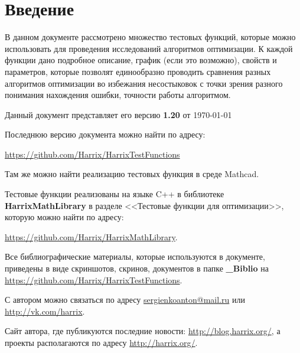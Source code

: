 \chapter*{Введение}

В данном документе рассмотрено множество тестовых функций, которые можно использовать для проведения исследований алгоритмов оптимизации. К каждой функции дано подробное описание, график (если это возможно), свойств и параметров, которые позволят единообразно проводить сравнения разных алгоритмов оптимизации во избежания несостыковок с точки зрения разного понимания нахождения ошибки, точности работы алгоритмом.

Данный документ представляет его версию \textbf{1.20} от \today

Последнюю версию документа можно найти по адресу:

\href{https://github.com/Harrix/HarrixTestFunctions}{https://github.com/Harrix/HarrixTestFunctions}

Там же можно найти реализацию тестовых функция в среде Mathcad.

Тестовые функции реализованы на языке C++ в библиотеке  \textbf{HarrixMathLibrary} в разделе <<Тестовые функции для оптимизации>>, которую можно найти по адресу:

\href{https://github.com/Harrix/HarrixMathLibrary} {https://github.com/Harrix/HarrixMathLibrary}.

Все библиографические материалы, которые используются в документе, приведены в виде скриншотов, скринов, документов в папке \textbf{\_Biblio} на \href{https://github.com/Harrix/HarrixTestFunctions}{https://github.com/Harrix/HarrixTestFunctions}.

С автором можно связаться по адресу \href{mailto:sergienkoanton@mail.ru}{sergienkoanton@mail.ru} или  \href{http://vk.com/harrix}{http://vk.com/harrix}.

Сайт автора, где публикуются последние новости: \href{http://blog.harrix.org/}{http://blog.harrix.org/}, а проекты располагаются по адресу \href{http://harrix.org/}{http://harrix.org/}.


\clearpage